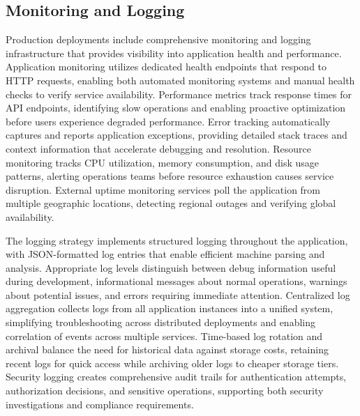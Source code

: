 \subsection{Monitoring and Logging}
Production deployments include comprehensive monitoring and logging infrastructure that provides visibility into application health and performance. Application monitoring utilizes dedicated health endpoints that respond to HTTP requests, enabling both automated monitoring systems and manual health checks to verify service availability. Performance metrics track response times for API endpoints, identifying slow operations and enabling proactive optimization before users experience degraded performance. Error tracking automatically captures and reports application exceptions, providing detailed stack traces and context information that accelerate debugging and resolution. Resource monitoring tracks CPU utilization, memory consumption, and disk usage patterns, alerting operations teams before resource exhaustion causes service disruption. External uptime monitoring services poll the application from multiple geographic locations, detecting regional outages and verifying global availability.

The logging strategy implements structured logging throughout the application, with JSON-formatted log entries that enable efficient machine parsing and analysis. Appropriate log levels distinguish between debug information useful during development, informational messages about normal operations, warnings about potential issues, and errors requiring immediate attention. Centralized log aggregation collects logs from all application instances into a unified system, simplifying troubleshooting across distributed deployments and enabling correlation of events across multiple services. Time-based log rotation and archival balance the need for historical data against storage costs, retaining recent logs for quick access while archiving older logs to cheaper storage tiers. Security logging creates comprehensive audit trails for authentication attempts, authorization decisions, and sensitive operations, supporting both security investigations and compliance requirements.

